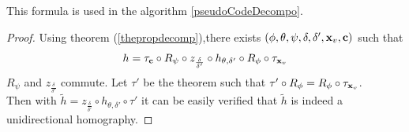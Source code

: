		This formula is used in the algorithm \ref{pseudoCodeDecompo}.
		
		\begin{proof}
	 Using theorem (\ref{thepropdecomp}),there exists $(\phi,\theta,\psi,\delta,\delta',\mathbf{x}_v,\mathbf{c})$ such that 
	 \begin{equation*}
	 h = \tau_{\mathbf{c}} \circ R_{\psi} \circ z_{\frac{\delta}{\delta'}} \circ h_{\theta,\delta'} \circ R_{\phi} \circ \tau_{\mathbf{x}_v}
	 \end{equation*}
	 $R_\psi$ and $z_{\frac{\delta}{\delta'}}$ commute. Let $\tau'$ be the theorem such that $\tau' \circ R_\phi =  R_\phi \circ \tau_{\mathbf{x}_v}$.\\
	 Then with $\tilde{h} = z_{\frac{\delta}{\delta'}} \circ 
	 h_{\theta,\delta'} \circ \tau'$ it can be easily verified that $\tilde{h}$ is indeed a unidirectional homography.
	 \end{proof}
	\label{ref_schema_decomp_cool}
